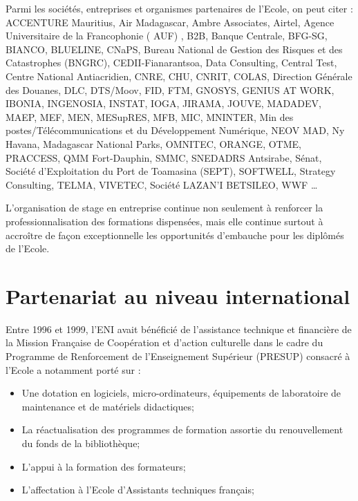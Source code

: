 \documentclass[12pt]{report}
\begin{document}
				Parmi les sociétés, entreprises et organismes partenaires de l’Ecole, on peut citer : ACCENTURE Mauritius, Air Madagascar, Ambre Associates, Airtel, Agence Universitaire de la Francophonie ( AUF) , B2B, Banque Centrale, BFG-SG, BIANCO, BLUELINE, CNaPS, Bureau National de Gestion des Risques et des Catastrophes (BNGRC), CEDII-Fianarantsoa, Data Consulting, Central Test, Centre National Antiacridien, CNRE, CHU, CNRIT, COLAS, Direction Générale des Douanes, DLC, DTS/Moov, FID, FTM, GNOSYS, GENIUS AT WORK, IBONIA, INGENOSIA, INSTAT, IOGA, JIRAMA, JOUVE, MADADEV, MAEP, MEF, MEN, MESupRES, MFB, MIC, MNINTER, Min des postes/Télécommunications et du Développement Numérique, NEOV MAD, Ny Havana, Madagascar National Parks, OMNITEC, ORANGE, OTME, PRACCESS, QMM Fort-Dauphin, SMMC, SNEDADRS Antsirabe, Sénat, Société d’Exploitation du Port de Toamasina (SEPT), SOFTWELL, Strategy Consulting, TELMA, VIVETEC, Société LAZAN’I BETSILEO, WWF … 
			
				L’organisation de stage en entreprise continue non seulement à renforcer la professionnalisation des formations dispensées, mais elle continue surtout à accroître de façon exceptionnelle les opportunités d’embauche pour les diplômés de l’Ecole.

				\section{Partenariat au niveau international}
				\begin{center}
					\begin{minipage}{\textwidth}
						\indent Entre 1996 et 1999, l’ENI avait bénéficié de l’assistance technique et financière de la Mission Française de Coopération et d’action culturelle dans le cadre du Programme de Renforcement de l’Enseignement Supérieur (PRESUP) consacré à l’Ecole a notamment porté sur :
						\begin{itemize}
							\item Une dotation en logiciels, micro-ordinateurs, équipements de laboratoire de maintenance et de matériels didactiques;
							\item La réactualisation des programmes de formation assortie du renouvellement du fonds de la bibliothèque;
							\item L’appui à la formation des formateurs;
							\item L’affectation à l’Ecole d’Assistants techniques français;\\
						\end{itemize}
					\end{minipage}
				\end{center}
				
\end{document}

